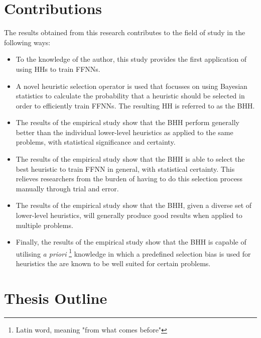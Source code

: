 \section{Contributions}
\label{sec:introduction:contributions}

The results obtained from this research contributes to the field of study in the
following ways:

\begin{itemize}
    \item
    To the knowledge of the author, this study provides the first application
    of using \acp{HH} to train \acp{FFNN}.

    \item
    A novel heuristic selection operator is used that focusses on using Bayesian
    statistics to calculate the probability that a heuristic should be selected
    in order to efficiently train \acp{FFNN}. The resulting \ac{HH} is referred
    to as the \Acl{BHH}.

    \item
    The results of the empirical study show that the \Ac{BHH} perform generally
    better than the individual lower-level heuristics as applied to the same
    problems, with statistical significance and certainty.

    \item
    The results of the empirical study show that the \Ac{BHH} is able to select
    the best heuristic to train \ac{FFNN} in general, with statistical
    certainty. This relieves researchers from the burden of having to do this
    selection process manually through trial and error.

    \item
    The results of the empirical study show that the \Ac{BHH}, given a diverse
    set of lower-level heuristics, will generally produce good results when
    applied to multiple problems.

    \item
    Finally, the results of the empirical study show that the \Ac{BHH} is
    capable of utilising \textit{a priori} \footnote{Latin word, meaning "from
    what comes before"} knowledge in which a predefined selection bias is used
    for heuristics the are known to be well suited for certain problems.
\end{itemize}


\section{Thesis Outline}
 \label{sec:introduction:outline}

